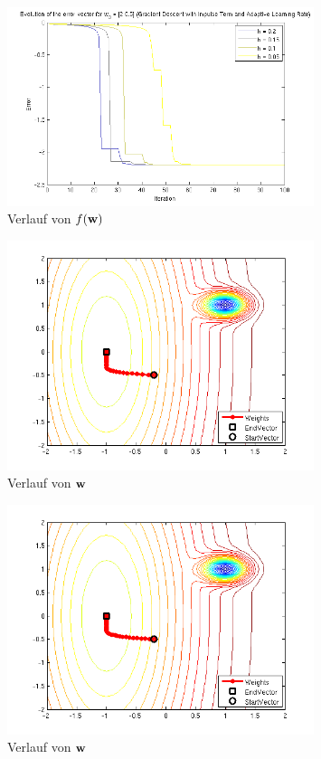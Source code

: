 \begin{figure}[h!]
  \centering
  \includegraphics[width=0.8\textwidth]{./figures/213/error_w01.png}
  \caption{Verlauf von $f(\mathbf{w})$}
  \label{fig:213_error_w01}
\end{figure}

\begin{figure}[h!]
  \centering
  \includegraphics[width=0.8\textwidth]{./figures/213/path_w02_eta02.png}
  \caption{Verlauf von $\mathbf{w}$}
  \label{fig:213_path_w02_eta02}
\end{figure}

\begin{figure}[h!]
  \centering
  \includegraphics[width=0.8\textwidth]{./figures/213/path_w02_eta015.png}
  \caption{Verlauf von $\mathbf{w}$}
  \label{fig:213_path_w02_eta015}
\end{figure}

